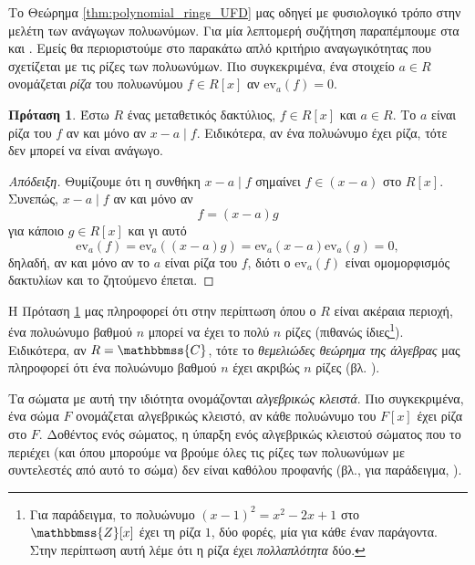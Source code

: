 \documentclass[12pt,a4paper,reqno]{amsart}
\theoremstyle{definition}
\newtheorem{proposition}[theorem]{Πρόταση}
\theoremstyle{remark}
\numberwithin{theorem}{section}
\numberwithin{exercise}{section}
\numberwithin{equation}{section}
\newcommand{\ZZ}{\mathbbmss{Z}}
\newcommand{\CC}{\mathbbmss{C}}
\newcommand{\ev}{\mathrm{ev}}
\begin{document}
Το Θεώρημα \ref{thm:polynomial_rings_UFD} μας οδηγεί με φυσιολογικό τρόπο στην μελέτη των ανάγωγων πολυωνύ\-μων. Για μία λεπτομερή συζήτηση παραπέμπουμε στα \cite[Ενότητα~9.4]{DF04} και \cite[Ενότητα~2.4]{VDEMT13}. Εμείς θα περιοριστούμε στο παρακάτω απλό κριτήριο αναγωγικότητας που σχετίζεται με τις ρίζες των πολυωνύμων. Πιο συγκεκριμένα, ένα στοιχείο $a \in R$ ονομάζεται \emph{ρίζα} του πολυωνύμου $f \in R[x]$ αν $\ev_a(f) = 0$.
\begin{proposition}
    \label{prop:roots}
    Έστω $R$ ένας μεταθετικός δακτύλιος, $f \in R[x]$ και $a \in R$. Το $a$ είναι ρίζα του $f$ αν και μόνο αν $x-a \mid f$. Ειδικότερα, αν ένα πολυώνυμο έχει ρίζα, τότε δεν μπορεί να είναι ανάγωγο.
\end{proposition}

\begin{proof}[Απόδειξη]
    Θυμίζουμε ότι η συνθήκη $x-a \mid f$ σημαίνει $f \in (x-a)$ στο $R[x]$. Συνεπώς, $x-a \mid f$ αν και μόνο αν 
    \[
    f = (x-a)g
    \]
    για κάποιο $g \in R[x]$ και γι αυτό 
    \[
    \ev_a(f) = \ev_a((x-a)g) = \ev_a(x-a)\ev_a(g) = 0,
    \]
    δηλαδή, αν και μόνο αν το $a$ είναι ρίζα του $f$, διότι ο $\ev_a(f)$ είναι ομομορφισμός δακτυλίων και το ζητούμενο έπεται.
\end{proof}

Η Πρόταση \ref{prop:roots} μας πληροφορεί ότι στην περίπτωση όπου ο $R$ είναι ακέραια περιοχή, ένα πολυώνυμο βαθμού $n$ μπορεί να έχει το πολύ $n$ ρίζες (πιθανώς ίδιες\footnote{Για παράδειγμα, το πολυώνυμο $(x-1)^2 = x^2 - 2x + 1$ στο $\ZZ[x]$ έχει τη ρίζα $1$, δύο φορές, μία για κάθε έναν παράγοντα. Στην περίπτωση αυτή λέμε ότι η ρίζα έχει \emph{πολλαπλότητα} δύο.}). Ειδικότερα, αν $R = \CC$, τότε το \emph{θεμελιώδες θεώρημα της άλγεβρας} μας πληροφορεί ότι ένα πολυώνυμο βαθμού $n$ έχει ακριβώς $n$ ρίζες (βλ. \cite[Θεώρημα 2.4.8]{VDEMT13}).

Τα σώματα με αυτή την ιδιότητα ονομάζονται \emph{αλγεβρικώς κλειστά}. Πιο συγκεκριμένα, ένα σώμα $F$ ονομάζεται αλγεβρικώς κλειστό, αν κάθε πολυώνυμο του $F[x]$ έχει ρίζα στο $F$. Δοθέντος ενός σώματος, η ύπαρξη ενός αλγεβρικώς κλειστού σώματος που το περιέχει (και όπου μπορούμε να βρούμε όλες τις ρίζες των πολυωνύμων με συντελεστές από αυτό το σώμα) δεν είναι καθόλου προφανής (βλ., για παράδειγμα, \cite[Πρόταση~30]{DF04}).
\end{document}

